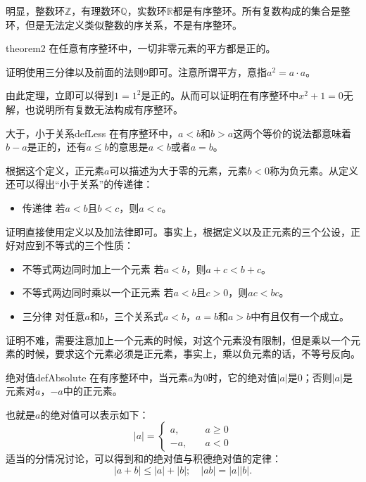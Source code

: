 明显，整数环$\mathbb{Z}$，有理数环$\mathbb{Q}$，实数环$\mathbb{R}$都是有序整环。所有复数构成的集合是整环，但是无法定义类似整数的序关系，不是有序整环。

\begin{theorem}{}{theorem2}
在任意有序整环中，一切非零元素的平方都是正的。
\end{theorem}

证明使用三分律以及前面的法则9即可。注意所谓平方，意指$a^2 = a \cdot a$。

由此定理，立即可以得到$1=1^2$是正的。从而可以证明在有序整环中$x^2+1=0$无解，也说明所有复数无法构成有序整环。

\begin{definition}{大于，小于关系}{defLess}
在有序整环中，$a<b$和$b>a$这两个等价的说法都意味着$b-a$是正的，还有$a \le b$的意思是$a<b$或者$a=b$。
\end{definition}
根据这个定义，正元素$a$可以描述为大于零的元素，元素$b<0$称为负元素。从定义还可以得出“小于关系”的传递律：
\begin{itemize}
\item 传递律 若$a < b$且$b<c$，则$a<c$。
\end{itemize}

证明直接使用定义以及加法律即可。事实上，根据定义以及正元素的三个公设，正好对应到不等式的三个性质：
\begin{itemize}
\item 不等式两边同时加上一个元素 若$a < b$，则$a+c < b+c$。
\item 不等式两边同时乘以一个正元素 若$a < b$且$c > 0$，则$ac < bc$。
\item 三分律 对任意$a$和$b$，三个关系式$a<b$，$a=b$和$a>b$中有且仅有一个成立。
\end{itemize}

证明不难，需要注意加上一个元素的时候，对这个元素没有限制，但是乘以一个元素的时候，要求这个元素必须是正元素，事实上，乘以负元素的话，不等号反向。

\begin{definition}{绝对值}{defAbsolute}
在有序整环中，当元素$a$为0时，它的绝对值$|a|$是0；否则$|a|$是元素对$a$，$-a$中的正元素。
\end{definition}
也就是$a$的绝对值可以表示如下： 
\[
|a| = \left\{
\begin{aligned}
a, &\quad a \ge 0 \\
-a, &\quad a < 0
\end{aligned}
\right.
\]
适当的分情况讨论，可以得到和的绝对值与积德绝对值的定律： 
\begin{equation}
|a+b| \le |a| + |b|; \quad |ab|=|a||b|.
\end{equation}

